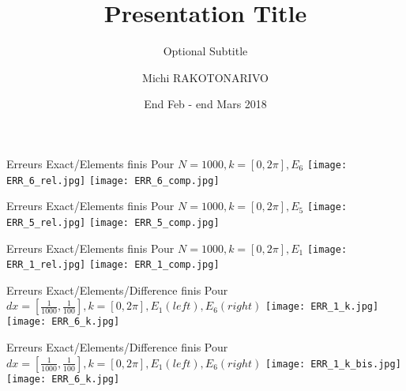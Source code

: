 \documentclass{beamer}
\title{Presentation Title}
\subtitle{Optional Subtitle}
\author{Michi RAKOTONARIVO}
\institute[Universities of Somewhere and Elsewhere] %
{
  LJK EDP
}
\date{End Feb  -  end Mars 2018}
\begin{document}
\begin{frame}{Erreurs Exact/Elements finis}
Pour $N=1000, k=[0,2\pi], E_6$
\texttt{[image: ERR\_6\_rel.jpg]} 
 \texttt{[image: ERR\_6\_comp.jpg]} 
\end{frame}



\begin{frame}{Erreurs Exact/Elements finis}
Pour $N=1000, k=[0,2\pi], E_5$
\texttt{[image: ERR\_5\_rel.jpg]} 
 \texttt{[image: ERR\_5\_comp.jpg]} 
\end{frame}

\begin{frame}{Erreurs Exact/Elements finis}
Pour $N=1000, k=[0,2\pi], E_1$
\texttt{[image: ERR\_1\_rel.jpg]} 
 \texttt{[image: ERR\_1\_comp.jpg]} 
\end{frame}

\begin{frame}{Erreurs Exact/Elements/Difference finis}
Pour $dx=[ \frac{1}{1000}, \frac{1}{100}], k=[0,2\pi], E_1(left), E_6(right)$
\texttt{[image: ERR\_1\_k.jpg]} 
\texttt{[image: ERR\_6\_k.jpg]} 
\end{frame}

\begin{frame}{Erreurs Exact/Elements/Difference finis}
Pour $dx=[ \frac{1}{1000}, \frac{1}{100}], k=[0,2\pi], E_1(left), E_6(right)$
\texttt{[image: ERR\_1\_k\_bis.jpg]} 
\texttt{[image: ERR\_6\_k.jpg]} 
\end{frame}
\end{document}

